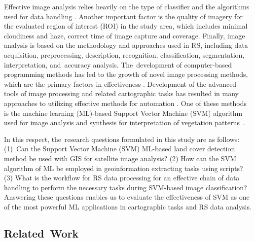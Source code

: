 \documentclass[earth,article,accept,pdftex,moreauthors]{Definitions/mdpi}
\begin{document}
{Effective image analysis relies heavily on} the type of {classifier} and the algorithms used for data handling{ }\cite{Lemenkova202212}. Another important factor {is} the quality of imagery for the evaluated {region of interest (ROI)} in {the} study area{, which includes} minimal cloudiness and haze, correct time of image capture {and} coverage{.} Finally, {image analysis is based on} the methodology and approaches {used in} {RS}, {including} data acquisition, preprocessing, description, recognition, classification, segmentation, interpretation, and~accuracy analysis. The~{development} of {computer-based} {programming} methods {has led to} the {growth} of {novel} {image processing} methods, {which} are the primary factors in {effectiveness} \cite{Duncan,jimaging9050098,Purkis,info14040249,DIOUF2001129}. Development of the advanced tools of image processing and related cartographic tasks has resulted in many approaches to utilizing effective methods {for automation} \cite{SUOMALAINEN2021112691,OlsonAnderson,Lemenkova202227,Ali,Olsonetal2019,Lemenkova202229}. {One of these methods is the {machine learning} (ML)-based Support Vector Machine (SVM) algorithm used for} image analysis and synthesis for interpretation of vegetation patterns~\cite{PUERTAS2013112,PETROPOULOS201170,ANEES2024102732,IBRAHIM2024100561}.

{In this respect}{, the~research questions formulated in this study are as follows: \mbox{(1) Can} the Support Vector Machine (SVM) {ML}-based land cover detection method be used with{ GIS} for satellite image analysis? (2) How can the SVM algorithm of ML be employed in geoinformation extracting tasks using scripts? (3) What is the workflow for {RS} data processing for an effective chain of data handling to perform{ }the necessary tasks during SVM-based image classification? Answering these questions enables us to evaluate the effectiveness of  {SVM} as one of the most powerful ML applications in cartographic tasks and RS data analysis.}

\subsection{Related~Work}
\end{document}
